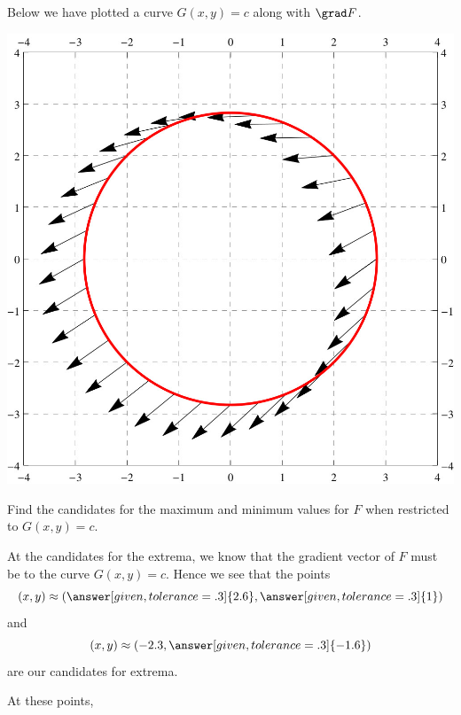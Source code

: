 \documentclass{ximera}
\begin{document}
\begin{example}
  Below we have plotted a curve $G(x,y) = c$ along with $\grad F$.
  \begin{image}
    \includegraphics{curveVectors2.jpg}
  \end{image}
  Find the candidates for the maximum and minimum values for $F$ when
  restricted to $G(x,y) = c$.
  \begin{explanation}
    At the candidates for the extrema, we know that the gradient
    vector of $F$ must be
     to
    the curve $G(x,y) = c$. Hence we see that the points
    \[
    (x,y)\approx\left(\answer[given,tolerance=.3]{2.6},\answer[given,tolerance=.3]{1}\right)
    \]
    and
    \[
    (x,y)\approx \left(-2.3,\answer[given,tolerance=.3]{-1.6}\right)
    \]
    are our candidates for extrema.
    \begin{feedback}[correct]
      At these points,
      \begin{image}

\end{image}
\end{feedback}
\end{explanation}
\end{example}
\end{document}
